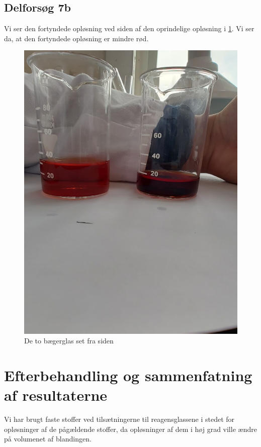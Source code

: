 \documentclass{report}
\begin{document}
\subsection*{Delforsøg 7b}
Vi ser den fortyndede opløsning ved siden af den oprindelige opløsning i \cref{fig:for7b}.
Vi ser da, at den fortyndede opløsning er mindre rød.
\begin{figure}[H]
\begin{center}
  \includegraphics[scale=0.23]{for7b.jpeg}
\end{center}
\caption{De to bægerglas set fra siden}
\label{fig:for7b}
\end{figure}
\section*{Efterbehandling og sammenfatning af resultaterne}
\begin{note}
  Vi har brugt faste stoffer ved tilsætningerne til reagensglassene i stedet for opløsninger af de pågældende stoffer, da opløsninger af dem i høj grad ville ændre på volumenet af blandingen.
\end{note}
\end{document}
